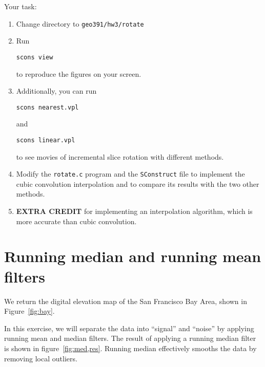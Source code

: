 
\lstset{language=python,numbers=left,numberstyle=\tiny,showstringspaces=false}


Your task:
\begin{enumerate}
\item Change directory to \verb#geo391/hw3/rotate#
\item Run 
\begin{verbatim}
scons view
\end{verbatim}
to reproduce the figures on your screen.
\item Additionally, you can run
\begin{verbatim}
scons nearest.vpl
\end{verbatim}
and
\begin{verbatim}
scons linear.vpl
\end{verbatim}
to see movies of incremental slice rotation with different methods.
\item Modify the \texttt{rotate.c} program and the \texttt{SConstruct} file to implement the cubic convolution interpolation and to compare 
its results with the two other methods.
\item \textbf{EXTRA CREDIT} for implementing an interpolation algorithm, which is more accurate than cubic convolution.
\end{enumerate}

\section{Running median and running mean filters}


We return the digital elevation map of the San Francisco Bay Area, shown in Figure~\ref{fig:bay}.

In this exercise, we will separate the data into ``signal'' and
``noise'' by applying running mean and median filters.  The result of
applying a running median filter is shown in
figure~\ref{fig:med,res}. Running median effectively smooths the data
by removing local outliers.


